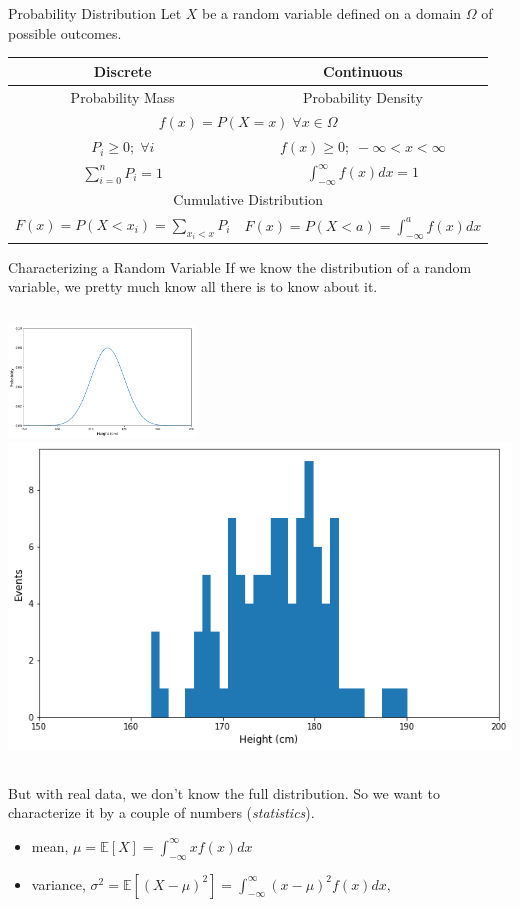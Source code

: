 \documentclass{beamer}
\begin{document}
\begin{frame}{Probability Distribution}
Let $X$ be a random variable defined on a domain $\Omega$ of possible outcomes. 
\renewcommand{\arraystretch}{1.4}
\begin{table}[bt]
	\begin{tabular}{|c|c|} \hline
		\textbf{Discrete} & \textbf{Continuous} \\ \hline
		Probability Mass & Probability Density \\ \hline		
		\multicolumn{2}{|c|}{$f(x) = P(X=x)\;\forall x\in\Omega$}\\ \hline
		$P_i \geq 0;\;\forall i$ & $f(x) \geq 0;\;-\infty < x < \infty$\\ \hline
		$\sum_{i=0}^{n} P_i = 1$ & $\int_{-\infty}^{\infty} f(x) dx = 1$\\ \hline
		\multicolumn{2}{|c|}{Cumulative Distribution} \\ \hline
		$F(x) = P(X<x_i) = \sum_{x_i<x} P_i$ & $F(x) = P(X<a) = \int_{-\infty}^{a} f(x) dx$ \\ \hline
	\end{tabular}
\end{table}
\end{frame}

\begin{frame}{Characterizing a Random Variable}
	If we know the distribution of a random variable, we pretty much know all there is to know about it. 
	\newline
	\begin{columns}
		\includegraphics[height=3cm]{continouos_random_variable}
		\includegraphics[height=3 cm]{real_data}
	\end{columns}
\vspace{0.5cm}
But with real data, we don't know the full distribution. So we want to characterize it by a couple of numbers (\emph{statistics}).
\footnotesize{
	\begin{itemize}
		\item mean, $\mu = \mathbb{E}[X] = \int_{-\infty}^{\infty} xf(x)dx$
		\item variance, 
		$\sigma^2 = \mathbb{E}[(X-\mu)^2] =\int_{-\infty}^{\infty} (x-\mu)^2f(x)dx$,
\end{itemize}}
\end{frame}
\end{document}
